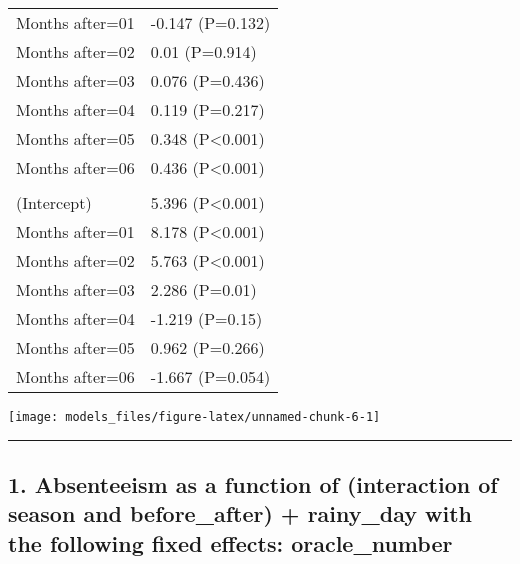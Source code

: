 \documentclass[]{article}
\begin{document}
\begin{longtable}[t]{ll}
\hspace{1em}Months after=01 & -0.147 (P=0.132)\\
\hspace{1em}Months after=02 & 0.01 (P=0.914)\\
\hspace{1em}Months after=03 & 0.076 (P=0.436)\\
\hspace{1em}Months after=04 & 0.119 (P=0.217)\\
\hspace{1em}Months after=05 & 0.348 (P<0.001)\\
\hspace{1em}Months after=06 & 0.436 (P<0.001)\\
\addlinespace[1.5em]
\multicolumn{2}{l}{\textbf{Temporary not field worker}}\\
\hspace{1em}(Intercept) & 5.396 (P<0.001)\\
\hspace{1em}Months after=01 & 8.178 (P<0.001)\\
\hspace{1em}Months after=02 & 5.763 (P<0.001)\\
\hspace{1em}Months after=03 & 2.286 (P=0.01)\\
\hspace{1em}Months after=04 & -1.219 (P=0.15)\\
\hspace{1em}Months after=05 & 0.962 (P=0.266)\\
\hspace{1em}Months after=06 & -1.667 (P=0.054)\\*
\end{longtable}

\begin{center}\texttt{[image: models\_files/figure-latex/unnamed-chunk-6-1]} \end{center}

\newpage

\begin{center}\rule{0.5\linewidth}{\linethickness}\end{center}

\subsection{1. Absenteeism as a function of (interaction of season and
before\_after) + rainy\_day with the following fixed effects:
oracle\_number}\label{absenteeism-as-a-function-of-interaction-of-season-and-before_after-rainy_day-with-the-following-fixed-effects-oracle_number}
\end{document}
